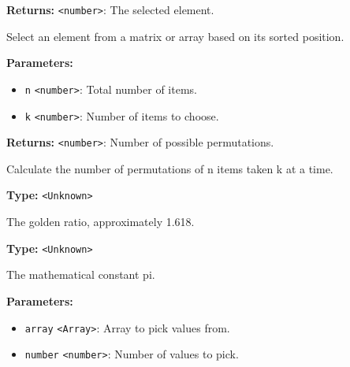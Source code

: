 \documentclass[12pt,a4paper]{article}
\begin{document}
\noindent \textbf{Returns:} \texttt{<number>}: The selected element.

\noindent Select an element from a matrix or array based on its sorted position.

\vspace{5mm}
\noindent {}


\noindent \textbf{Parameters:}
\begin{itemize}
  \item \texttt{n} \texttt{<number>}: Total number of items.
  \item \texttt{k} \texttt{<number>}: Number of items to choose.
\end{itemize}

\noindent \textbf{Returns:} \texttt{<number>}: Number of possible permutations.

\noindent Calculate the number of permutations of n items taken k at a time.

\vspace{5mm}
\noindent {}\vspace{4mm}


\noindent \textbf{Type:} \texttt{<Unknown>}

\noindent The golden ratio, approximately 1.618.

\vspace{5mm}
\noindent {}\vspace{4mm}


\noindent \textbf{Type:} \texttt{<Unknown>}

\noindent The mathematical constant pi.

\vspace{5mm}
\noindent {}


\noindent \textbf{Parameters:}
\begin{itemize}
  \item \texttt{array} \texttt{<Array>}: Array to pick values from.
  \item \texttt{number} \texttt{<number>}: Number of values to pick.
\end{itemize}
\end{document}
